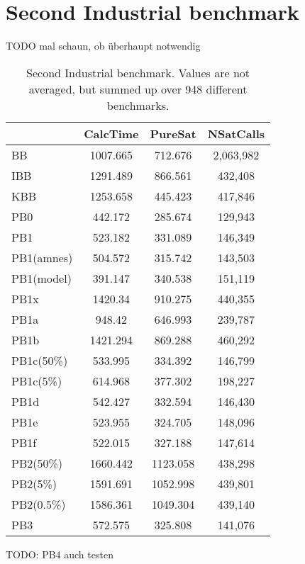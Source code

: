 \section{Second Industrial benchmark}

TODO mal schaun, ob überhaupt notwendig

\begin{wraptable}{R}{8cm}
\begin{tabular}{l| c c c }

 & CalcTime & PureSat & NSatCalls \\
 \hline
BB & 1007.665 & 712.676 & 2,063,982 \\
IBB & 1291.489 & 866.561 & 432,408 \\
KBB & 1253.658 & 445.423 & 417,846 \\
PB0 & 442.172 & 285.674 & 129,943 \\
PB1 & 523.182 & 331.089 & 146,349 \\
PB1(amnes) & 504.572 & 315.742 & 143,503 \\
PB1(model) & 391.147 & 340.538 & 151,119 \\
PB1x & 1420.34 & 910.275 & 440,355 \\
PB1a & 948.42 & 646.993 & 239,787 \\
PB1b & 1421.294 & 869.288 & 460,292 \\
PB1c(50\%) & 533.995 & 334.392 & 146,799 \\
PB1c(5\%) & 614.968 & 377.302 & 198,227 \\
PB1d & 542.427 & 332.594 & 146,430 \\
PB1e & 523.955 & 324.705 & 148,096 \\
PB1f & 522.015 & 327.188 & 147,614 \\
PB2(50\%) & 1660.442 & 1123.058 & 438,298 \\
PB2(5\%) & 1591.691 & 1052.998 & 439,801 \\
PB2(0.5\%) & 1586.361 & 1049.304 & 439,140 \\
PB3 & 572.575 & 325.808 & 141,076 \\

\end{tabular}
\caption{Second Industrial benchmark. Values are not averaged, but summed up over 948 different benchmarks.}
\label{tab:vonThore2pof} %
\end{wraptable}

TODO: PB4 auch testen